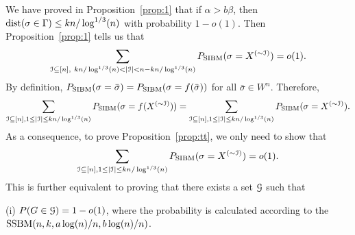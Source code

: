 \documentclass{article}
\begin{document}
We have proved in Proposition~\ref{prop:1} that if $\alpha>b\beta$, then $\operatorname{dist}(\sigma \in \Gamma) \le kn/\log^{1/3}(n)$
 with probability $1-o(1)$.
Then Proposition~\ref{prop:1} tells us that
$$
\sum_{\cI\subseteq[n],~
kn/\log^{1/3}(n)<|\cI|<n-kn/\log^{1/3}(n)} P_{\SIBM}(\sigma=X^{(\sim\cI)})  = o(1) .
$$
By definition, $P_{\operatorname{SIBM}}(\sigma=\bar{\sigma})=P_{\operatorname{SIBM}}(\sigma=f(\bar{\sigma}))$ for all $\bar{\sigma}\in W^n$. Therefore, 
$$
\sum_{\mathcal{I}\subseteq[n],1\le |\mathcal{I}|\le kn/\log^{1/3}(n)} P_{\operatorname{SIBM}}(\sigma=f(X^{(\sim\mathcal{I})})) =\sum_{\mathcal{I}\subseteq[n],1\le |\mathcal{I}|\le kn/\log^{1/3}(n)} P_{\operatorname{SIBM}}(\sigma=X^{(\sim\mathcal{I})}).
$$
As a consequence, to prove Proposition~\ref{prop:tt}, we only need to show that
$$
\sum_{\mathcal{I}\subseteq[n],1\le |\mathcal{I}|\le kn/\log^{1/3}(n)} P_{\operatorname{SIBM}}(\sigma=X^{(\sim\mathcal{I})}) 
= o(1) .
$$
This is further equivalent to proving that there exists a set $\mathcal{G}$ such that

\noindent (i)
$P(G\in\mathcal{G})=1-o(1)$, where the probability is calculated according to the $\SSBM(n, k,a\log(n)/n, \linebreak[4] b\log(n)/n)$.
\end{document}
